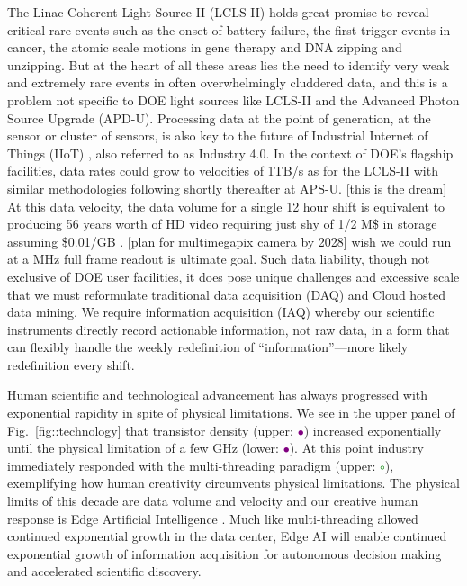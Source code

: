 \documentclass{article}
\begin{document}
The Linac Coherent Light Source II (LCLS-II) holds great promise to reveal critical rare events such as the onset of battery failure, the first trigger events in cancer, the atomic scale motions in gene therapy and DNA zipping and unzipping.
But at the heart of all these areas lies the need to identify very weak and extremely rare events in often overwhelmingly cluddered data, and this is a problem not specific to DOE light sources like LCLS-II and the Advanced Photon Source Upgrade (APD-U).
Processing data at the point of generation, at the sensor or cluster of sensors, is also key to the future of Industrial Internet of Things (IIoT) \cite{Gartner2018,NetworkWorld2019}, also referred to as Industry 4.0.
In the context of DOE's flagship facilities, data rates could grow to velocities of 1TB/s as for the LCLS-II with similar methodologies following shortly thereafter at APS-U.
[this is the dream] At this data velocity, the data volume for a single 12 hour shift is equivalent to producing 56 years worth of HD video \cite{HowBigVideo} requiring just shy of 1/2 M\$ in storage assuming \$0.01/GB \cite{CostPerTB}.
[plan for multimegapix camera by 2028] wish we could run at a MHz full frame readout is ultimate goal. 
%
Such data liability, though not exclusive of DOE user facilities, it does pose unique challenges and excessive scale that we must reformulate traditional data acquisition (DAQ) and Cloud hosted data mining.
We require information acquisition (IAQ) whereby our scientific instruments directly record actionable information, not raw data, in a form that can flexibly handle the weekly redefinition of ``information''---more likely redefinition every shift.

Human scientific and technological advancement has always progressed with exponential rapidity \cite{Kurzweil} in spite of physical limitations.
We see in the upper panel of Fig.~\ref{fig::technology} that transistor density (upper: \textcolor{purple}{$\bullet$}) increased exponentially until the physical limitation of a few GHz (lower: \textcolor{purple}{$\bullet$}).
At this point industry immediately responded with the multi-threading paradigm (upper: \textcolor{green}{$\circ$}), exemplifying how human creativity circumvents physical limitations.
The physical limits of this decade are data volume and velocity and our creative human response is Edge Artificial Intelligence \cite{thetech,NetworkWorld2019b}.
Much like multi-threading allowed continued exponential growth in the data center, Edge AI will enable continued exponential growth of information acquisition for autonomous decision making and accelerated scientific discovery.
\end{document}
